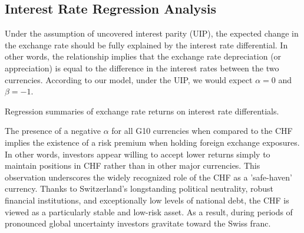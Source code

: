 \documentclass{article}
\begin{document}
\subsection{Interest Rate Regression Analysis}
Under the assumption of uncovered interest parity (UIP), the expected change in the exchange rate should be fully explained by the interest rate differential. In other words, the relationship implies that the exchange rate depreciation (or appreciation) is equal to the difference in the interest rates between the two currencies. According to our model, under the UIP, we would expect $\alpha=0$ and $\beta=-1$.

\begin{table}[H]
\centering
\caption{Regression summaries of exchange rate returns on interest rate differentials.} 
\label{tab:regression}
\end{table}
The presence of a negative $\alpha$  for all G10 currencies when compared to the CHF implies the existence of a risk premium when holding foreign exchange exposures. In other words, investors appear willing to accept lower returns simply to maintain positions in CHF rather than in other major currencies. This observation underscores the widely recognized role of the CHF as a 'safe-haven' currency. Thanks to 
Switzerland’s longstanding political neutrality, robust financial institutions, and exceptionally low levels of national debt, the CHF is viewed as a particularly stable and low-risk asset. As a result, during periods of pronounced global uncertainty investors gravitate toward the Swiss franc.
\end{document}
